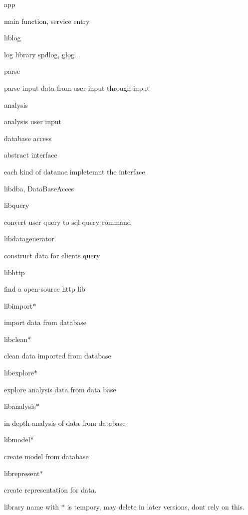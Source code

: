 \begin{DoxyItemize}
\item app

main function, service entry
\item liblog

log library spdlog, glog...
\item parse

parse input data from user input through input
\item analysis

analysis user input
\item database access
\begin{DoxyItemize}
\item abstract interface
\item each kind of datanae impletemnt the interface
\item libdba, Data\+Base\+Acces
\end{DoxyItemize}
\item libquery

convert user query to sql query command
\item libdatagenerator

construct data for client\textquotesingle{}s query
\item libhttp

find a open-\/source http lib
\item libimport$\ast$

import data from database
\item libclean$\ast$

clean data imported from database
\item libexplore$\ast$

explore analysis data from data base
\item libanalysis$\ast$

in-\/depth analysis of data from database
\item libmodel$\ast$

create model from database
\item librepresent$\ast$

create representation for data.
\end{DoxyItemize}

library name with $\ast$ is tempory, may delete in later versions, don\textquotesingle{}t rely on this. 